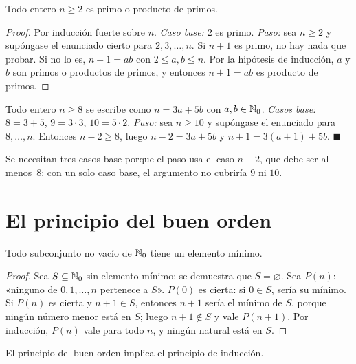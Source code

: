 \begin{teorema}\label{teo:factorizacion}
Todo entero $n\ge 2$ es primo o producto de primos.
\end{teorema}

\begin{proof}
Por inducción fuerte sobre $n$. \emph{Caso base:} $2$ es primo. \emph{Paso:} sea $n\ge 2$ y supóngase el enunciado cierto para $2,3,\dots,n$. Si $n+1$ es primo, no hay nada que probar. Si no lo es, $n+1=ab$ con $2\le a,b\le n$. Por la hipótesis de inducción, $a$ y $b$ son primos o productos de primos, y entonces $n+1=ab$ es producto de primos.
\end{proof}

\begin{ejemplo}\label{ej:sellos}
Todo entero $n\ge 8$ se escribe como $n=3a+5b$ con $a,b\in\mathbb{N}_0$. \emph{Casos base:} $8=3+5$, $9=3\cdot 3$, $10=5\cdot 2$. \emph{Paso:} sea $n\ge 10$ y supóngase el enunciado para $8,\dots,n$. Entonces $n-2\ge 8$, luego $n-2=3a+5b$ y $n+1=3(a+1)+5b$. \hfill$\blacksquare$

Se necesitan tres casos base porque el paso usa el caso $n-2$, que debe ser al menos~8; con un solo caso base, el argumento no cubriría $9$ ni $10$.
\end{ejemplo}

\section{El principio del buen orden}

\begin{teorema}\label{teo:buen-orden}
Todo subconjunto no vacío de $\mathbb{N}_0$ tiene un elemento mínimo.
\end{teorema}

\begin{proof}
Sea $S\subseteq\mathbb{N}_0$ sin elemento mínimo; se demuestra que $S=\varnothing$. Sea $P(n)$: «ninguno de $0,1,\dots,n$ pertenece a $S$». $P(0)$ es cierta: si $0\in S$, sería su mínimo. Si $P(n)$ es cierta y $n+1\in S$, entonces $n+1$ sería el mínimo de $S$, porque ningún número menor está en $S$; luego $n+1\notin S$ y vale $P(n+1)$. Por inducción, $P(n)$ vale para todo $n$, y ningún natural está en $S$.
\end{proof}

\begin{proposicion}\label{prop:bo-induccion}
El principio del buen orden implica el principio de inducción.
\end{proposicion}

